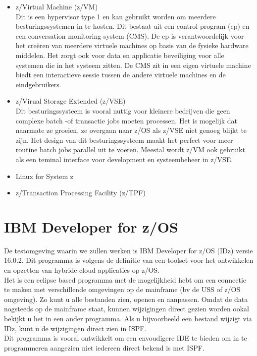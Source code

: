 \begin{itemize}
    \item z/Virtual Machine (z/VM)\\
    Dit is een hypervisor type 1 en kan gebruikt worden om meerdere besturingssystemen in te hosten. Dit bestaat uit een control program (cp) en een conversation monitoring system (CMS). De cp is verantwoordelijk voor het creëren van meerdere virtuele machines op basis van de fysieke hardware middelen. Het zorgt ook voor data en applicatie beveiliging voor alle systemen die in het systeem zitten. De CMS zit in een eigen virtuele machine biedt een interactieve sessie tussen de andere virtuele machines en de eindgebruikers. \autocite{IBMb} \\
    
    \item z/Virual Storage Extended (z/VSE) \\
    Dit besturingssysteem is vooral nuttig voor kleinere bedrijven die geen complexe batch -of transactie jobs moeten processen. Het is mogelijk dat naarmate ze groeien, ze overgaan naar z/OS als z/VSE niet genoeg blijkt te zijn. Het design van dit besturingssysteem maakt het perfect voor meer routine batch jobs parallel uit te voeren. Meestal wordt z/VM ook gebruikt als een teminal interface voor development en systeembeheer in z/VSE. \autocite{IBMb} \\
    
    \item Linux for System z \\
    
    \item z/Transaction Processing Facility (z/TPF) \\
\end{itemize}


\section{IBM Developer for z/OS}
\label{sec:IBM Developer for z/OS (IDz)}
De testomgeving waarin we zullen werken is IBM Developer for z/OS (IDz) versie 16.0.2. Dit programma is volgens de definitie van \textcite{Spohn2023} een toolset voor het ontwikkelen en opzetten van hybride cloud applicaties op z/OS. \\
Het is een eclipse based programma met de mogelijkheid hebt om een connectie te maken met verschillende omgevingen op de mainframe (bv de USS of z/OS omgeving). Zo kunt u alle bestanden zien, openen en aanpassen. Omdat de data nogsteeds op de mainframe staat, kunnen wijzigingen direct gezien worden ookal bekijkt u het in een ander programma. Als u bijvoorbeeld een bestand wijzigt via IDz, kunt u de wijzigingen direct zien in ISPF. \\
Dit programma is vooral ontwikkelt om een envoudigere IDE te bieden om in te programmeren aangezien niet iedereen direct bekend is met ISPF. \\

